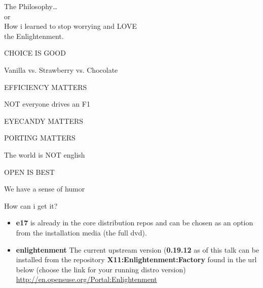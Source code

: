 \documentclass{beamer}
\begin{document}
    \begin{frame}
        \center\huge The Philosophy\ldots \\
        or \\
        How i learned to stop worrying and LOVE\\
        the Enlightenment.
    \end{frame}

    \begin{frame}
        \center CHOICE IS GOOD
    \end{frame}

    \begin{frame}
        \center Vanilla vs. Strawberry vs. Chocolate
    \end{frame}

    \begin{frame}
        \center EFFICIENCY MATTERS
    \end{frame}

    \begin{frame}
        \center NOT everyone drives an F1
    \end{frame}

    \begin{frame}
        \center EYECANDY MATTERS
    \end{frame}

    \begin{frame}
        \center PORTING MATTERS
    \end{frame}

    \begin{frame}
        \center The world is NOT english
    \end{frame}

    \begin{frame}
        \center OPEN IS BEST
    \end{frame}
        
    \begin{frame}
        \center We have a sense of humor
    \end{frame}

    \begin{frame}{How can i get it?}
        \begin{itemize}
            \item {\bf e17} is already in the core distribution repos and can be
                  chosen as an option from the installation media
                  (the full dvd).
            \item {\bf enlightenment} The current upstream version ({\bf 0.19.12} as of
                  this talk can be installed from the repository
                  {\bf X11:Enlightenment:Factory} found in the url below
                  (choose the link for your running distro version)
                  \url{http://en.opensuse.org/Portal:Enlightenment}
        \end{itemize}
    \end{frame}
\end{document}
